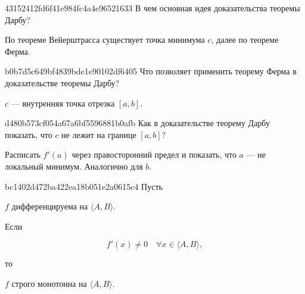 
\begin{note}{43152412fd6f41e984fc4a4e96521633}
    В чем основная идея доказательства теоремы Дарбу?

    \begin{cloze}{1}
        По теореме Вейерштрасса существует точка минимума \( c \), далее по теореме Ферма.
    \end{cloze}
\end{note}

\begin{note}{b0b7d5c649bf4839bde1e90102df6405}
    Что позволяет применить теорему Ферма в доказательстве теоремы Дарбу?

    \begin{cloze}{1}
        \( c \) --- внутренняя точка отрезка \( [a, b] \).
    \end{cloze}
\end{note}

\begin{note}{d480b573cf054a67a6bf5596881b0afb}
    Как в доказательстве теорему Дарбу показать, что \( c \) не лежит на границе \( [a, b] \)?

    \begin{cloze}{1}
        Расписать \( f'(a) \) через правосторонний предел и показать, что \( a \) --- не локальный минимум. Аналогично для \( b \).
    \end{cloze}
\end{note}

\begin{note}{bc1402d472ba422ea18b051e2a0615c4}
    Пусть \begin{icloze}{3}\( f \) дифференцируема на \( \langle A, B \rangle  \).\end{icloze} Если
    \begin{icloze}{2}\[
        f'(x) \neq 0 \quad \forall x \in \langle A, B \rangle,
    \]\end{icloze}
    то \begin{icloze}{1}\( f \) строго монотонна на \( \langle A, B \rangle  \).\end{icloze}
\end{note}

